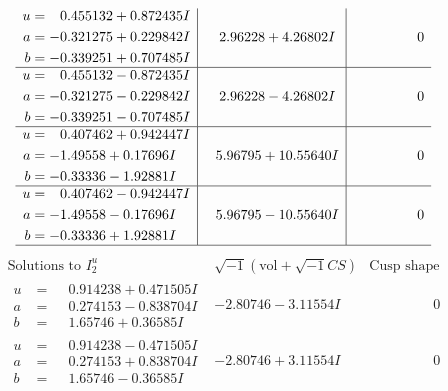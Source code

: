 \documentclass[1p]{elsarticle_modified}
\theoremstyle{definition}
\newcommand{\I}{\sqrt{-1}}
\begin{document}
$$\begin{array}{c|c|c}
\begin{aligned}
u &= \phantom{-}0.455132 + 0.872435 I \\
a &= -0.321275 + 0.229842 I \\
b &= -0.339251 + 0.707485 I\end{aligned}
 & \phantom{-}2.96228 + 4.26802 I & \phantom{-0.000000 } 0 \\ \hline\begin{aligned}
u &= \phantom{-}0.455132 - 0.872435 I \\
a &= -0.321275 - 0.229842 I \\
b &= -0.339251 - 0.707485 I\end{aligned}
 & \phantom{-}2.96228 - 4.26802 I & \phantom{-0.000000 } 0 \\ \hline\begin{aligned}
u &= \phantom{-}0.407462 + 0.942447 I \\
a &= -1.49558 + 0.17696 I \\
b &= -0.33336 - 1.92881 I\end{aligned}
 & \phantom{-}5.96795 + 10.55640 I & \phantom{-0.000000 } 0 \\ \hline\begin{aligned}
u &= \phantom{-}0.407462 - 0.942447 I \\
a &= -1.49558 - 0.17696 I \\
b &= -0.33336 + 1.92881 I\end{aligned}
 & \phantom{-}5.96795 - 10.55640 I & \phantom{-0.000000 } 0\\
 \hline 
 \end{array}$$\newpage$$\begin{array}{c|c|c}  
\text{Solutions to }I^u_{2}& \I (\text{vol} + \sqrt{-1}CS) & \text{Cusp shape}\\
 \hline 
\begin{aligned}
u &= \phantom{-}0.914238 + 0.471505 I \\
a &= \phantom{-}0.274153 - 0.838704 I \\
b &= \phantom{-}1.65746 + 0.36585 I\end{aligned}
 & -2.80746 - 3.11554 I & \phantom{-0.000000 } 0 \\ \hline\begin{aligned}
u &= \phantom{-}0.914238 - 0.471505 I \\
a &= \phantom{-}0.274153 + 0.838704 I \\
b &= \phantom{-}1.65746 - 0.36585 I\end{aligned}
 & -2.80746 + 3.11554 I & \phantom{-0.000000 } 0 \\ \hline\begin{aligned}

\end{aligned}
\end{array}$$
\end{document}
